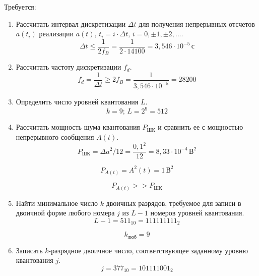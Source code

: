 \documentclass[a4paper, 12pt]{article}
\begin{document}
Требуется:
\begin{enumerate}
  \item Рассчитать интервал дискретизации $\Delta t$ для 
  получения непрерывных отсчетов $a(t_i)$ реализации 
  $a(t),\, t_i=i\cdot\Delta t,\, i=0,\pm1,\pm2,...$.
  \begin{equation}
    \Delta t \leq \frac{1}{2f_B}=\frac1 {2\cdot 14100} = 3,546\cdot 10^{-5}\, с 
  \end{equation}

  \item Рассчитать частоту дискретизации $f_d$.
  \begin{equation}
    f_d=\frac{1}{\Delta t}\geq 2f_B=\frac{1}{3,546\cdot 10^{-5}}=28200 
  \end{equation}

  \item Определить число уровней квантования $L$.
  \begin{equation}
    k=9;\, L=2^9 = 512 
  \end{equation}

  \item Рассчитать мощность шума квантования $P_{ШК}$
  и сравнить ее с мощностью непрерывного сообщения $A(t)$.
  \begin{equation}
    P_{ШК}=\Delta a^2/12
    =\frac{0,1^2}{12}=8,33\cdot10^{-4}\, В^2 
  \end{equation}

  \begin{equation}
    P_{A(t)}=A^2(t)=1\, В^2
  \end{equation}

  \begin{equation}
    P_{A(t)} >> P_{ШК} 
  \end{equation}

  \item Найти минимальное число $k$ двоичных разрядов, 
  требуемое для записи в двоичной форме любого номера $j$ 
  из $L-1$ номеров уровней квантования.
  \begin{equation}
    L-1=511_{10}=111111111_2 
  \end{equation}

  \begin{equation}
    k_{люб}=9 
  \end{equation}

  \item Записать $k$-разрядное двоичное число, 
  соответствующее заданному уровню квантования $j$.
  \begin{equation}
    j=377_{10}=101111001_2 
  \end{equation}


\end{enumerate}
\end{document}
